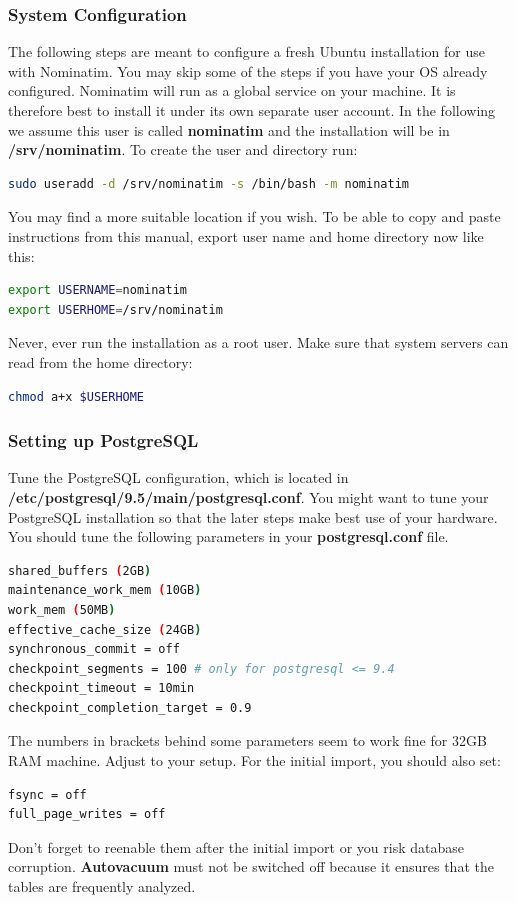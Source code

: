 \subsubsection{System Configuration}
The following steps are meant to configure a fresh Ubuntu installation for use with Nominatim.
You may skip some of the steps if you have your OS already configured.
Nominatim will run as a global service on your machine. It is therefore best to install it under its
own separate user account. In the following we assume this user is called \textbf{nominatim} and the
installation will be in \textbf{/srv/nominatim}. To create the user and directory run:
\begin{lstlisting}[language=bash,breaklines=true]
sudo useradd -d /srv/nominatim -s /bin/bash -m nominatim
\end{lstlisting}
You may find a more suitable location if you wish.
To be able to copy and paste instructions from this manual, export user name and home
directory now like this:
\begin{lstlisting}[language=bash,breaklines=true]
export USERNAME=nominatim
export USERHOME=/srv/nominatim
\end{lstlisting}
Never, ever run the installation as a root user.
Make sure that system servers can read from the home directory:
\begin{lstlisting}[language=bash,breaklines=true]
chmod a+x $USERHOME
\end{lstlisting}
\subsubsection{Setting up PostgreSQL}
Tune the PostgreSQL configuration, which is located in\\ \textbf{/etc/postgresql/9.5/main/postgresql.conf}. You might want to tune your PostgreSQL installation so that the later steps make best use of your hardware. You should tune the following parameters in your \textbf{postgresql.conf} file.
\begin{lstlisting}[language=bash,breaklines=true]
shared_buffers (2GB)
maintenance_work_mem (10GB)
work_mem (50MB)
effective_cache_size (24GB)
synchronous_commit = off
checkpoint_segments = 100 # only for postgresql <= 9.4
checkpoint_timeout = 10min
checkpoint_completion_target = 0.9
\end{lstlisting}
The numbers in brackets behind some parameters seem to work fine for 32GB RAM machine.
Adjust to your setup.
For the initial import, you should also set:
\begin{lstlisting}[language=bash,breaklines=true]
fsync = off
full_page_writes = off
\end{lstlisting}
Don't forget to reenable them after the initial import or you risk database corruption.
\textbf{Autovacuum} must not be switched off because it ensures that the tables are frequently
analyzed.
